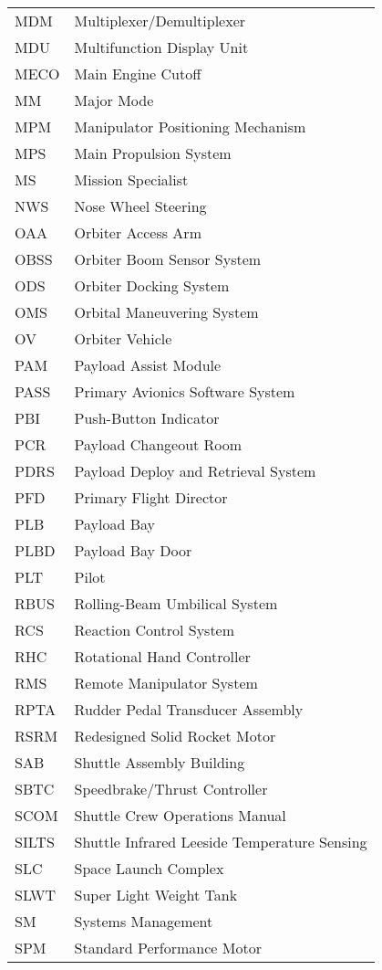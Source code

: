 \documentclass[Space_Shuttle_Vessel_Manual.tex]{subfiles}
\begin{document}
\begin{longtable}{l l }
MDM & Multiplexer/Demultiplexer\\
MDU & Multifunction Display Unit\\
MECO & Main Engine Cutoff\\
MM & Major Mode\\
MPM & Manipulator Positioning Mechanism\\
MPS & Main Propulsion System\\
MS & Mission Specialist\\
NWS & Nose Wheel Steering\\
OAA & Orbiter Access Arm\\
OBSS & Orbiter Boom Sensor System\\
ODS & Orbiter Docking System\\
OMS & Orbital Maneuvering System\\
OV & Orbiter Vehicle\\
PAM & Payload Assist Module\\
PASS & Primary Avionics Software System\\
PBI & Push-Button Indicator\\
PCR & Payload Changeout Room\\
PDRS & Payload Deploy and Retrieval System\\
PFD & Primary Flight Director\\
PLB & Payload Bay\\
PLBD & Payload Bay Door\\
PLT & Pilot\\
RBUS & Rolling-Beam Umbilical System\\
RCS & Reaction Control System\\
RHC & Rotational Hand Controller\\
RMS & Remote Manipulator System\\
RPTA & Rudder Pedal Transducer Assembly\\
RSRM & Redesigned Solid Rocket Motor\\
SAB & Shuttle Assembly Building\\
SBTC & Speedbrake/Thrust Controller\\
SCOM & Shuttle Crew Operations Manual\\
SILTS & Shuttle Infrared Leeside Temperature Sensing\\
SLC & Space Launch Complex\\
SLWT & Super Light Weight Tank\\
SM & Systems Management\\
SPM & Standard Performance Motor\\

\end{longtable}
\end{document}
